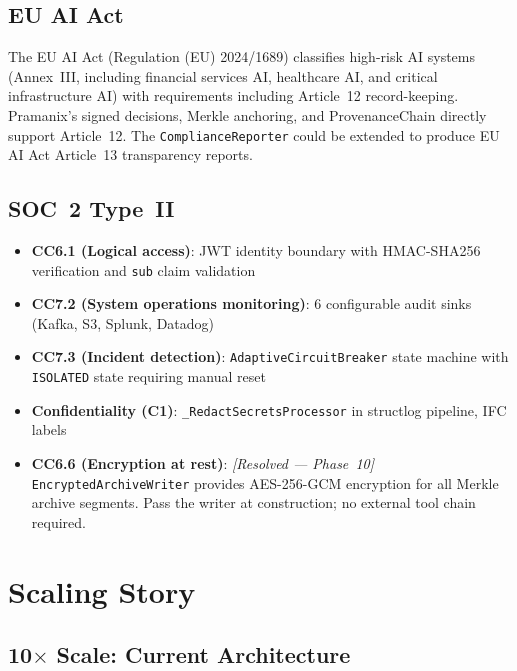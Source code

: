 \documentclass[12pt,a4paper,oneside]{report}
\newcommand{\code}[1]{\texttt{#1}}           %
\begin{document}
\section{EU AI Act}

The EU AI Act (Regulation (EU) 2024/1689) classifies high-risk AI systems
(Annex~III, including financial services AI, healthcare AI, and critical
infrastructure AI) with requirements including Article~12 record-keeping.
Pramanix's signed decisions, Merkle anchoring, and ProvenanceChain directly
support Article~12. The \code{ComplianceReporter} could be extended to
produce EU AI Act Article~13 transparency reports.

\section{SOC~2 Type~II}

\begin{itemize}
  \item \textbf{CC6.1 (Logical access)}: JWT identity boundary with
        HMAC-SHA256 verification and \code{sub} claim validation
  \item \textbf{CC7.2 (System operations monitoring)}: 6 configurable audit
        sinks (Kafka, S3, Splunk, Datadog)
  \item \textbf{CC7.3 (Incident detection)}: \code{AdaptiveCircuitBreaker}
        state machine with \code{ISOLATED} state requiring manual reset
  \item \textbf{Confidentiality (C1)}: \code{\_RedactSecretsProcessor} in
        structlog pipeline, IFC labels
  \item \textbf{CC6.6 (Encryption at rest)}: \textit{[Resolved — Phase~10]}
        \code{EncryptedArchiveWriter} provides AES-256-GCM encryption for all
        Merkle archive segments.  Pass the writer at construction;
        no external tool chain required.
\end{itemize}

\chapter{Scaling Story}

\section{10$\times$ Scale: Current Architecture}
\end{document}
